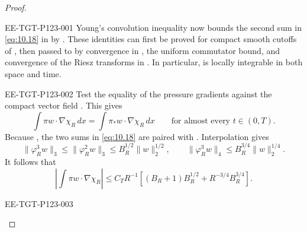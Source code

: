 \begin{proof}
%
\begin{EESegment}{EE-TGT-P123-001}
Young's convolution inequality now bounds the second sum in \eqref{eq:10.18} in
 by . These identities
can first be proved for compact smooth cutoffs of , then passed to
 by convergence in , the uniform
commutator bound, and convergence of the Riesz transforms in
. In particular,
 is locally integrable in both space and time.
\end{EESegment}

\begin{EESegment}{EE-TGT-P123-002}
Test the equality of the pressure gradients against the compact vector field
. This gives
\[
  \int\pi w\cdot\nabla\chi_R\,dx
  =\int\pi_*w\cdot\nabla\chi_R\,dx
  \qquad\text{for almost every }t\in(0,T).
\]
Because , the two sums in
\eqref{eq:10.18} are paired with
. Interpolation gives
\[
  \|\varphi_R^3w\|_3\leq\|\varphi_R^2w\|_3
  \leq B_R^{1/2}\|w\|_2^{1/2},
  \qquad
  \|\varphi_R^3w\|_4\leq B_R^{3/4}\|w\|_2^{1/4}.
\]
It follows that
\begin{equation}
  \left|\int\pi w\cdot\nabla\chi_R\right|
  \leq C_TR^{-1}\left[(B_R+1)B_R^{1/2}+R^{-3/4}B_R^{3/4}\right].
\tag{10.19}\label{eq:10.19}
\end{equation}
\end{EESegment}

\begin{EESegment}{EE-TGT-P123-003}

\end{EESegment}
\end{proof}
